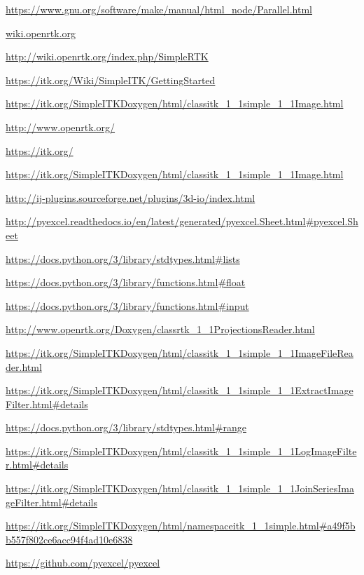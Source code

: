 \documentclass[a4paper,12pt, doubleside]{report}
\begin{document}
\begin{thebibliography}{1}
        \url{https://www.gnu.org/software/make/manual/html_node/Parallel.html}

        \url{wiki.openrtk.org}

        \url{http://wiki.openrtk.org/index.php/SimpleRTK}
    
        \url{https://itk.org/Wiki/SimpleITK/GettingStarted}
    
        \url{https://itk.org/SimpleITKDoxygen/html/classitk_1_1simple_1_1Image.html}
    
    
        \url{http://www.openrtk.org/}
    
        \url{https://itk.org/}
        
        \url{https://itk.org/SimpleITKDoxygen/html/classitk_1_1simple_1_1Image.html}

        \url{http://ij-plugins.sourceforge.net/plugins/3d-io/index.html}
        
        \url{http://pyexcel.readthedocs.io/en/latest/generated/pyexcel.Sheet.html#pyexcel.Sheet}
        
        \url{https://docs.python.org/3/library/stdtypes.html#lists}
        
        \url{https://docs.python.org/3/library/functions.html#float}
        
        \url{https://docs.python.org/3/library/functions.html#input}
        
        \url{http://www.openrtk.org/Doxygen/classrtk_1_1ProjectionsReader.html}
    
        \url{https://itk.org/SimpleITKDoxygen/html/classitk_1_1simple_1_1ImageFileReader.html}
    
        \url{https://itk.org/SimpleITKDoxygen/html/classitk_1_1simple_1_1ExtractImageFilter.html#details}
    
        \url{https://docs.python.org/3/library/stdtypes.html#range}
        
        \url{https://itk.org/SimpleITKDoxygen/html/classitk_1_1simple_1_1LogImageFilter.html#details}
        
        \url{https://itk.org/SimpleITKDoxygen/html/classitk_1_1simple_1_1JoinSeriesImageFilter.html#details}
        
        \url{https://itk.org/SimpleITKDoxygen/html/namespaceitk_1_1simple.html#a49f5bb557f802ce6acc94f4ad10e6838}
        
        \url{https://github.com/pyexcel/pyexcel}
    
    \end{thebibliography}
\end{document}
